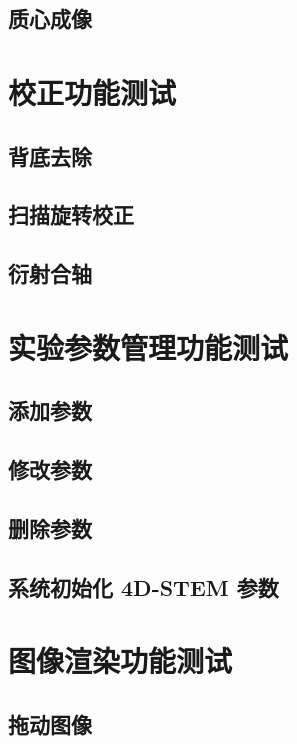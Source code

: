 \documentclass[a4paper,12pt]{report}	%
\begin{document}
\subsection{质心成像}

\section{校正功能测试}

\subsection{背底去除}

\subsection{扫描旋转校正}

\subsection{衍射合轴}

\section{实验参数管理功能测试}

\subsection{添加参数}

\subsection{修改参数}

\subsection{删除参数}

\subsection{系统初始化 4D-STEM 参数}

\section{图像渲染功能测试}

\subsection{拖动图像}
\end{document}

